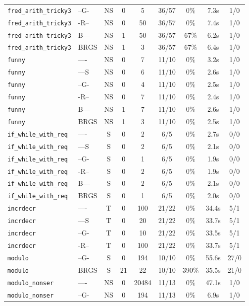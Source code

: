 \begin{tabular}{llccccccc}
\texttt{fred_arith_tricky3} & --G- & NS & 0 & 5 & 36/57 & 0\% & 7.3s & 1/0 \\
\texttt{fred_arith_tricky3} & -R-- & NS & 0 & 50 & 36/57 & 0\% & 7.4s & 1/0 \\
\texttt{fred_arith_tricky3} & B--- & NS & 1 & 50 & 36/57 & 67\% & 6.2s & 1/0 \\
\texttt{fred_arith_tricky3} & BRGS & NS & 1 & 3 & 36/57 & 67\% & 6.4s & 1/0 \\
\texttt{funny} & ---- & NS & 0 & 7 & 11/10 & 0\% & 3.2s & 1/0 \\
\texttt{funny} & ---S & NS & 0 & 6 & 11/10 & 0\% & 2.6s & 1/0 \\
\texttt{funny} & --G- & NS & 0 & 4 & 11/10 & 0\% & 2.5s & 1/0 \\
\texttt{funny} & -R-- & NS & 0 & 7 & 11/10 & 0\% & 2.4s & 1/0 \\
\texttt{funny} & B--- & NS & 1 & 7 & 11/10 & 0\% & 2.6s & 1/0 \\
\texttt{funny} & BRGS & NS & 1 & 3 & 11/10 & 0\% & 2.5s & 1/0 \\
\texttt{if_while_with_req} & ---- & S & 0 & 2 & 6/5 & 0\% & 2.7s & 0/0 \\
\texttt{if_while_with_req} & ---S & S & 0 & 2 & 6/5 & 0\% & 2.1s & 0/0 \\
\texttt{if_while_with_req} & --G- & S & 0 & 1 & 6/5 & 0\% & 1.9s & 0/0 \\
\texttt{if_while_with_req} & -R-- & S & 0 & 2 & 6/5 & 0\% & 1.9s & 0/0 \\
\texttt{if_while_with_req} & B--- & S & 0 & 2 & 6/5 & 0\% & 2.1s & 0/0 \\
\texttt{if_while_with_req} & BRGS & S & 0 & 1 & 6/5 & 0\% & 2.0s & 0/0 \\
\texttt{incrdecr} & ---- & T & 0 & 100 & 21/22 & 0\% & 34.4s & 5/1 \\
\texttt{incrdecr} & ---S & T & 0 & 20 & 21/22 & 0\% & 33.7s & 5/1 \\
\texttt{incrdecr} & --G- & T & 0 & 10 & 21/22 & 0\% & 33.5s & 5/1 \\
\texttt{incrdecr} & -R-- & T & 0 & 100 & 21/22 & 0\% & 33.7s & 5/1 \\
\texttt{modulo} & --G- & S & 0 & 194 & 10/10 & 0\% & 55.6s & 27/0 \\
\texttt{modulo} & BRGS & S & 21 & 22 & 10/10 & 390\% & 35.5s & 21/0 \\
\texttt{modulo_nonser} & ---- & NS & 0 & 20484 & 11/13 & 0\% & 47.1s & 1/0 \\
\texttt{modulo_nonser} & --G- & NS & 0 & 194 & 11/13 & 0\% & 6.9s & 1/0 \\

\end{tabular}
